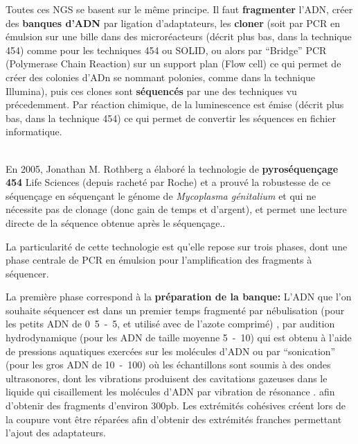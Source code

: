 \documentclass[a4paper,11pt,twoside]{report}
\begin{document}
Toutes ces NGS se basent sur le même principe. Il faut \textbf{fragmenter} l'ADN, créer des \textbf{banques d'ADN} par ligation d'adaptateurs, les \textbf{cloner} (soit par PCR en émulsion sur une bille dans des microréacteurs (décrit plus bas, dans la technique 454) comme pour les techniques 454 ou SOLID, ou alors par ``Bridge'' PCR (Polymerase Chain Reaction) sur un support plan (Flow cell) ce qui permet de créer des colonies d'ADn se nommant polonies, comme dans la technique Illumina), puis ces clones sont \textbf{séquencés} par une des techniques vu précedemment. Par réaction chimique, de la luminescence est émise (décrit plus bas, dans la technique 454) ce qui permet de convertir les séquences en fichier informatique.

~~\\

En 2005, Jonathan M. Rothberg a élaboré la technologie de \textbf{pyroséquençage 454} Life Sciences (depuis racheté par Roche) et a prouvé la robustesse de ce séquençage en séquençant le génome de \textit{Mycoplasma génitalium} \citep{Margulies2005aa} et qui ne nécessite pas de clonage (donc gain de temps et d’argent), et permet une lecture directe de la séquence obtenue après le séquençage.\citep{sengenes2012developpement}.

La particularité de cette technologie est qu'elle repose sur trois phases, dont une phase centrale de PCR en émulsion pour l'amplification des fragments à séquencer. \citep{Margulies2005aa} \citep{sengenes2012developpement}

La première phase correspond à la \textbf{préparation de la banque:} L’ADN que l'on souhaite séquencer est dans un premier temps fragmenté par nébulisation \citep{loman2012performance} (pour les petits ADN de \unit{0.5-5}{\micro\metre}\citep{Prodromou2007aa}, et utilisé avec de l'azote comprimé)\citep{syed2009next} , par audition hydrodynamique \citep{poptsova2014non} (pour les ADN de taille moyenne \unit{5-10}{\micro\metre})\citep{Prodromou2007aa} qui est obtenu à l'aide de pressions aquatiques exercées sur les molécules d'ADN \citep{poptsova2014non} ou par ``sonication'' \citep{Knierim2011aa} (pour les gros ADN de \unit{10-100}{\micro\metre})\citep{Prodromou2007aa} où les échantillons sont soumis à des ondes ultrasonores, dont les vibrations produisent des cavitations gazeuses dans le liquide qui cisaillement les molécules d'ADN par vibration de résonance \citep{Knierim2011aa}. afin d'obtenir des fragments d'environ 300pb. Les extrémités cohésives créent lors de la coupure vont être réparées afin d’obtenir des extrémités franches permettant l’ajout des adaptateurs.\citep{Prodromou2007aa} \citep{sengenes2012developpement}
\end{document}
